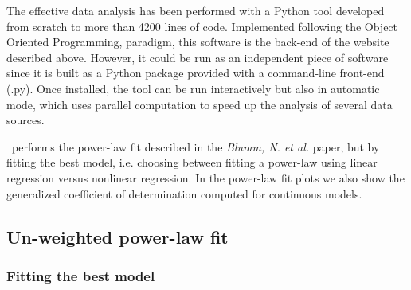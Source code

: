 The effective data analysis has been performed with a Python tool developed from scratch to more than 4200 lines of code. Implemented following the Object Oriented Programming, paradigm, this software is the back-end of the website described above. However, it could be run as an independent piece of software since it is built as a Python package provided with a command-line front-end (\CC.py). Once installed, the tool can be run interactively but also in automatic mode, which uses parallel computation to speed up the analysis of several data sources. 

\CC\ performs the power-law fit described in the \emph{Blumm, N. et al.} paper, but by fitting the best model, i.e. choosing between fitting a power-law using linear regression versus nonlinear regression\cite{ecology}. In the power-law fit plots we also show the generalized coefficient of determination computed for continuous models\cite{genR2,disR2}.

\subsection*{Un-weighted power-law fit}\label{sec:unw}

\subsubsection*{Fitting the best model}

